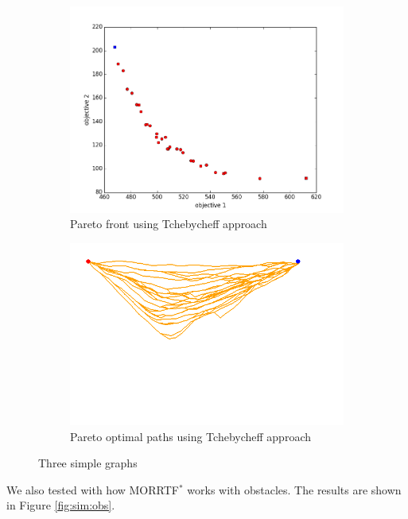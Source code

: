 \documentclass[conference]{IEEEtran}
\begin{document}
\begin{figure}
\begin{subfigure}[b]{0.45\linewidth}
		\includegraphics[width=\textwidth]{fig/sim2-2obj/PF02-MORRT2.png}
		\caption{Pareto front using Tchebycheff approach}
		\label{fig:sim:norm:pf:c}
	\end{subfigure} 
	\begin{subfigure}[b]{0.45\linewidth}
		\centering
		\includegraphics[width=\textwidth]{fig/sim2-2obj/MORRTstar00-ALL.png}
		\caption{Pareto optimal paths using Tchebycheff approach}
		\label{fig:sim:norm:sols:c}
	\end{subfigure}
	\caption{Three simple graphs}
	\label{fig:sim:norm}
\end{figure}

We also tested with how MORRTF$^{*}$ works with obstacles.
The results are shown in Figure \ref{fig:sim:obs}.
\end{document}
